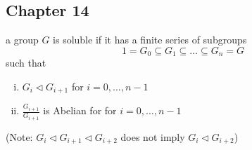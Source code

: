 \documentclass{article}
\theoremstyle{definition}
\newenvironment{defn}[1]
{\renewcommand\theinnerdefn{#1}\innerdefn}
{\endinnerdefn}
\begin{document}
\subsection{Chapter 14}

\begin{defn}{14.1} \label{14.1}
  a group $G$ is soluble if it has a finite series of subgroups
  $$1=G_0 \subseteq G_1 \subseteq \ldots \subseteq G_n = G$$
  such that
  \begin{enumerate}[i.]
    \item $G_i \lhd G_{i+1}$ for $i=0,\ldots,n-1$
    \item $\frac{G_{i+1}}{G_{i+1}}$ is Abelian for for $i=0,\ldots,n-1$
  \end{enumerate}

  (Note: $G_i \lhd G_{i+1} \lhd G_{i+2}$ does not imply $G_i \lhd G_{i+2}$)
\end{defn}
\end{document}
